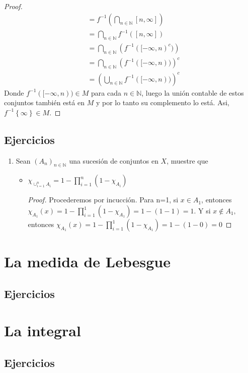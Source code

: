 \documentclass[spanish,12pt,a4paper,openany]{book}
\begin{document}
\begin{enumerate}
\begin{proof}
\begin{align*}
													   &= f^{-1} \displaystyle\left(\bigcap _{n \in \mathbb{N}} [n, \infty ] \right)\\
													   &=\displaystyle \bigcap_{n \in \mathbb{N}} f^{-1}([n, \infty])\\
													   &= \displaystyle \bigcap_{n \in \mathbb{N}} \left(f^{-1}([-\infty, n)^{c}) \right)\\
													   &= \displaystyle \bigcap_{n \in \mathbb{N}} \left(f^{-1}([-\infty, n)) \right)^{c}\\
													   &= \displaystyle \left( \bigcup_{n \in \mathbb{N}} f^{-1}([-\infty,n)) \right)^{c}
			\end{align*}
			Donde $f^{-1}([- \infty, n)) \in M$ para cada $n \in \mathbb{N}$, luego la unión contable de estos conjuntos también está en $M$ y por lo tanto su complemento lo está. Asi, $f^{-1} \left\{ \infty \right\} \in M.$
		\end{proof}
	\end{enumerate}
	\section{Ejercicios}
	\begin{enumerate}
		\item Sean $(A_{n})_{n \in \mathbb{N}}$ una sucesión de conjuntos en $X$, muestre que
		\begin{itemize}
			\item $\chi_{\cup_{i=1}^{n} A_{i}} = 1 - \prod_{i=1}^{n}(1- \chi_{A_{i}})$
			\begin{proof}
				Procederemos por incucción. Para n=1, si $x \in A_{1}$, entonces  $ \chi_{A_{1}}(x) = 1 - \prod_{i=1}^{1}(1- \chi_{A_{1}}) = 1-(1-1) = 1$. Y si $x \notin A_{1},$ entonces  $ \chi_{A_{1}}(x) = 1 - \prod_{i=1}^{1}(1- \chi_{A_{1}}) = 1-(1-0) = 0$
			\end{proof}
		\end{itemize}
	\end{enumerate}
\chapter{La medida de Lebesgue}
	\section{Ejercicios}
\chapter{La integral}
	\section{Ejercicios}
\end{document}
